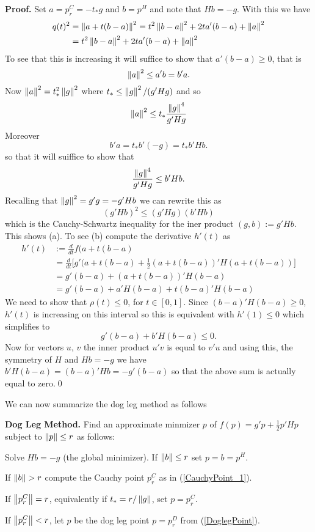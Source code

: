 \medskip\noindent
\textbf{Proof.} Set $a=p^C_r=-t_*g$ and $b=p^H$ and note that $Hb=-g$.
With this we have
%
\begin{align}
q(t)^2&=
\left\|a+t(b-a)\right\|^2=
t^2\left\|b-a\right\|^2+2ta'(b-a)+\left\|a\right\|^2\\&=
t^2\left\|b-a\right\|^2+2ta'(b-a)+\left\|a\right\|^2
\end{align}
%
To see that this is increasing it will suffice to show that $a'(b-a)\geq 0$, that is
$$
\left\|a\right\|^2\leq a'b=b'a.
$$
Now $\left\|a\right\|^2 = t_*^2\left\|g\right\|^2$ where $t_*\leq \left\|g\right\|^2/(g'Hg)$ and so
$$
\left\|a\right\|^2 \leq t_*\frac{\left\|g\right\|^4}{g'Hg}
$$
Moreover
$$
b'a = t_*b'(-g)=t_*b'Hb.
$$
so that it will suiffice to show that
$$
\frac{\left\|g\right\|^4}{g'Hg}\leq b'Hb.
$$
Recalling that $\left\|g\right\|^2=g'g=-g'Hb$ we can rewrite this as
$$
(g'Hb)^2\leq (g'Hg)(b'Hb)
$$
which is the Cauchy-Schwartz inequality for the iner product $(g,b):=g'Hb$.
This shows (a). To see (b) compute the derivative $h'(t)$ as
%
\begin{align*}
h'(t) &:= 
\frac{d}{dt}f(a+t(b-a)\\&=
\frac{d}{dt}\big[g'(a+t(b-a)+\tfrac{1}{2}(a+t(b-a))'H(a+t(b-a))\big]\\&=
g'(b-a)+(a+t(b-a))'H(b-a)\\&=
g'(b-a)+a'H(b-a)+t(b-a)'H(b-a)
\end{align*}
%
We need to show that $\rho(t)\leq 0$, for $t\in[0,1]$. Since $(b-a)'H(b-a)\geq0$,
$h'(t)$ is increasing on this interval so this is equivalent with $h'(1)\leq 0$
which simplifies to
$$
g'(b-a)+b'H(b-a)\leq 0.
$$
Now for vectors $u$, $v$ the inner product $u'v$ is equal to $v'u$ and using this,
the symmetry of $H$ and $Hb=-g$ we have $b'H(b-a)=(b-a)'Hb=-g'(b-a)$ so that the above
sum is actually equal to zero.\qed

\medskip\noindent
We can now summarize the dog leg method as follows

\medskip\noindent
\textbf{Dog Leg Method.}
Find an approximate minmizer $p$ of $f(p)=g'p+\tfrac{1}{2}p'Hp$ subject to 
$\left\|p\right\|\leq r$ as follows:
%
\begin{packed_itemize}
\item
Solve $Hb=-g$ (the global minimizer). If $\left\|b\right\|\leq r$ set $p=b=p^H$.
\item
If $\norm b>r$ compute the Cauchy point $p^C_r$ as in (\ref{CauchyPoint_1}).
\item
If $\left\|p^C_r\right\|=r$, equivalently if $t_*=r/\left\|g\right\|$, set $p=p^C_r$.
\item
If $\left\|p^C_r\right\|<r$, let $p$ be the dog leg point $p=p^D_r$ from (\ref{DoglegPoint}).
\end{packed_itemize}
%

